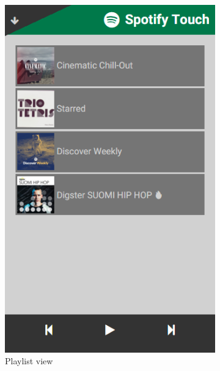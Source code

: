 \documentclass[conference]{IEEEtran}
\begin{document}
\begin{figure}[htbp]
\begin{subfigure}{0.45\columnwidth}
        \includegraphics[width=0.9\linewidth]{spotify_playlists.png}
        \caption{Playlist view}
        \label{fig:PlaylistView}
    \end{subfigure}
    \begin{subfigure}{0.45\columnwidth}
        \centering

\end{subfigure}
\end{figure}
\end{document}
